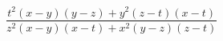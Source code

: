 \begin{ex}[type=expression]
	\begin{condition}
		\( \dfrac{t^2(x-y)(y-z)+y^2(z-t)(x-t)}{z^2(x-y)(x-t)+x^2(y-z)(z-t)} \)
	\end{condition}
\end{ex}
